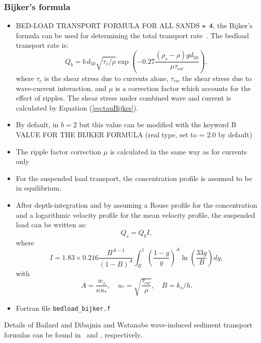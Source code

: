 \subsubsection{Bijker's formula}
\begin{itemize}
\item {\ttfamily BED-LOAD TRANSPORT FORMULA FOR ALL SANDS} \texttt{= 4}, the Bijker's formula can be used for determining the total transport rate~\cite{Bijker}. The bedload transport rate is:
\begin{equation*}
Q_b = b\,d_{50}\sqrt{\tau_c/\rho}\exp\left(-0.27\frac{(\rho_s-\rho)gd_{50}}{\mu \tau_{cw}}\right),
\end{equation*}
where $\tau_c$ is the shear stress due to currents alone, $\tau_{cw}$ the shear stress due to wave-current
interaction, and $\mu$ is a correction factor which accounts for the effect of ripples. The shear stress under combined wave and current is calculated
by Equation (\ref{eq:tauBijker}).
\item By default, in \gaia{} $b=2$ but this value can be modified with the keyword {\ttfamily B VALUE FOR THE BIJKER FORMULA} (real type, set to {\ttfamily = 2.0} by default)

\item The ripple factor correction $\mu$ is calculated in the same way as for currents only
  \item For the suspended load transport, the
concentration profile is assumed to be in equilibrium.

\item After depth-integration and by assuming a Rouse profile for the concentration
and a logarithmic velocity profile for the mean velocity profile, the
suspended load can be written as:
\begin{equation*}
Q_{s} = Q_{b} I,
\end{equation*}
where
\begin{equation*}
I=1.83\times 0.216\frac{B^{A-1}}{(1-B)^A} \int_B^1
\left(\frac{1-y}{y}\right)^A \ln\left(\frac{33y}{B}\right) d y,
\end{equation*}
with
\begin{equation*}
A = \frac{w_s}{\kappa u_*},\quad u_*=\sqrt{\frac{\tau_{cw}}{\rho}},\quad B = k_s/h.
\end{equation*}
\item Fortran file \texttt{bedload\_bijker.f}
\end{itemize}

Details of Bailard and Dibajnia and Watanabe wave-induced sediment transport formulas can be found in~\cite{Bailard} and \cite{Dibajnia}, respectively.


